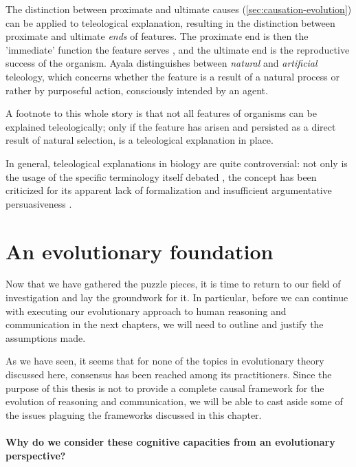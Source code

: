 The distinction between proximate and ultimate causes (\cref{sec:causation-evolution}) can be applied to teleological explanation, resulting in the distinction between proximate and ultimate \emph{ends} of features. The proximate end is then the 'immediate' function the feature serves , and the ultimate end is the reproductive success of the organism.
 Ayala distinguishes between \emph{natural} and \emph{artificial} teleology, which concerns whether the feature is a result of a natural process or rather by purposeful action, consciously intended by an agent.

A footnote to this whole story is that not all features of organisms can be explained teleologically; only if the feature has arisen and persisted as a direct result of natural selection, is a teleological explanation in place.

In general, teleological explanations in biology are quite controversial: not only is the usage of the specific terminology itself debated \citep[p.~27 and references therein]{Ayala99}, the concept has been criticized for its apparent lack of formalization and insufficient argumentative persuasiveness \citep[p.~83]{Baedke2021}.

\section{An evolutionary foundation}

Now that we have gathered the puzzle pieces, it is time to return to our field of investigation and lay the groundwork for it. In particular, before we can continue with executing our evolutionary approach to human reasoning and communication in the next chapters, we will need to outline and justify the assumptions made.

As we have seen, it seems that for none of the topics in evolutionary theory discussed here, consensus has been reached among its practitioners. Since the purpose of this thesis is not to provide a complete causal framework for the evolution of reasoning and communication, we will be able to cast aside some of the issues plaguing the frameworks discussed in this chapter.

\paragraph{Why do we consider these cognitive capacities from an evolutionary perspective?}

